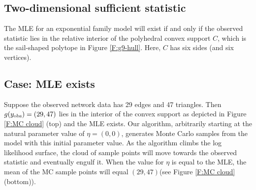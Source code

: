 \subsection{Two-dimensional sufficient statistic}\label{S:example 2dim}
The MLE for an exponential family model will exist if and only if the observed 
statistic lies in the relative interior of the polyhedral convex support $C$, which 
is the sail-shaped polytope in Figure \ref{F:g9-hull}. Here, $C$ has six 
sides (and six vertices).

\subsection{Case: MLE exists}
Suppose the observed network data has 29 edges and 47 triangles.  Then $g(y_{\text{obs}}) = (29,47)$
lies in the interior of the convex support as depicted in Figure \ref{F:MC cloud} 
(top) and the MLE exists.
Our algorithm, arbitrarily starting at the natural parameter value of $\eta = (0,0)$, 
generates Monte Carlo samples from the model with this initial parameter value.  As 
the algorithm climbs the log likelihood surface, 
the cloud of sample points will move towards 
the observed statistic and eventually engulf it.  
When the value for $\eta$ is equal to the MLE, the mean of the MC sample points will 
equal $(29,47)$(see Figure \ref{F:MC cloud} (bottom)).  
